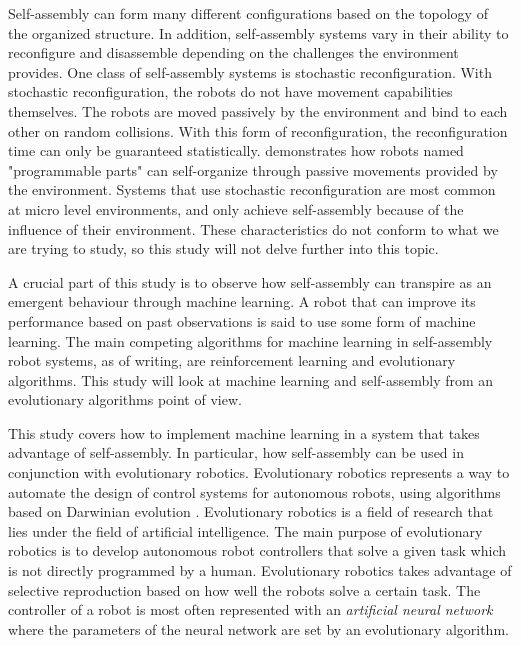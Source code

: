 Self-assembly can form many different configurations based on the topology of the organized structure.
In addition, self-assembly systems vary in their ability to reconfigure and disassemble depending on the challenges the environment provides.
One class of self-assembly systems is stochastic reconfiguration. 
With stochastic reconfiguration, the robots do not have movement capabilities themselves. 
The robots are moved passively by the environment and bind to each other on random collisions\cite{gro_autonomous_2006}. 
With this form of reconfiguration, the reconfiguration time can only be guaranteed statistically\cite{yim_modular_2007}.
\cite{bishop_programmable_2005} demonstrates how robots named "programmable parts" can self-organize through passive movements provided by the environment. Systems that use stochastic reconfiguration are most common at micro level environments, and only achieve self-assembly because of the influence of their environment.
These characteristics do not conform to what we are trying to study, so this study will not delve further into this topic.

A crucial part of this study is to observe how self-assembly can transpire as an emergent behaviour through machine learning.
A robot that can improve its performance based on past observations is said to use some form of machine learning.
The main competing algorithms for machine learning in self-assembly robot systems, as of writing, are reinforcement learning and evolutionary algorithms.
This study will look at machine learning and self-assembly from an evolutionary algorithms point of view.

This study covers how to implement machine learning in a system that takes advantage of self-assembly.
In particular, how self-assembly can be used in conjunction with evolutionary robotics.
Evolutionary robotics represents a way to automate the design of control systems for autonomous robots, using algorithms based on Darwinian evolution \cite{trianni_evolving_2004}.
Evolutionary robotics is a field of research that lies under the field of artificial intelligence. 
The main purpose of evolutionary robotics is to develop autonomous robot controllers that solve a given task which is not directly programmed by a human.
Evolutionary robotics takes advantage of selective reproduction based on how well the robots solve a certain task.
The controller of a robot is most often represented with an \emph{artificial neural network} where the parameters of the neural network are set by an evolutionary algorithm.


